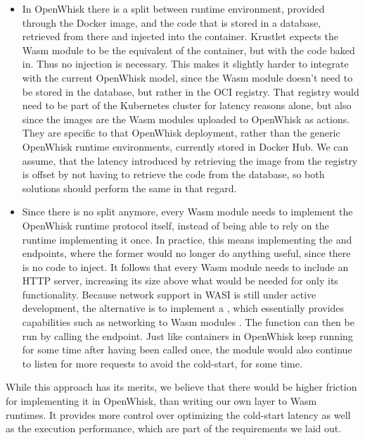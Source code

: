 \begin{itemize}
    \item In OpenWhisk there is a split between runtime environment, provided through the Docker image, and the code that is stored in a database, retrieved from there and injected into the container. Krustlet expects the Wasm module to be the equivalent of the container, but with the code baked in. Thus no injection is necessary. This makes it slightly harder to integrate with the current OpenWhisk model, since the Wasm module doesn't need to be stored in the database, but rather in the OCI registry. That registry would need to be part of the Kubernetes cluster for latency reasons alone, but also since the images are the Wasm modules uploaded to OpenWhisk as actions. They are specific to that OpenWhisk deployment, rather than the generic OpenWhisk runtime environments, currently stored in Docker Hub. We can assume, that the latency introduced by retrieving the image from the registry is offset by not having to retrieve the code from the database, so both solutions should perform the same in that regard.
    \item Since there is no split anymore, every Wasm module needs to implement the OpenWhisk runtime protocol itself, instead of being able to rely on the runtime implementing it once. In practice, this means implementing the  and  endpoints, where the former would no longer do anything useful, since there is no code to inject. It follows that every Wasm module needs to include an HTTP server, increasing its size above what would be needed for only its functionality. Because network support in WASI is still under active development, the alternative is to implement a , which essentially provides capabilities such as networking to Wasm modules \cite{WC2021}. The function can then be run by calling the  endpoint. Just like containers in OpenWhisk keep running for some time after having been called once, the module would also continue to listen for more requests to avoid the cold-start, for some time.
\end{itemize}


While this approach has its merits, we believe that there would be higher friction for implementing it in OpenWhisk, than writing our own layer to Wasm runtimes. It provides more control over optimizing the cold-start latency as well as the execution performance, which are part of the requirements we laid out.

